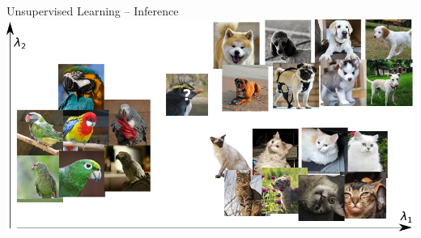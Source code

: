 \documentclass[handout,aspectratio=169]{beamer}
\begin{document}
	\begin{frame}{Unsupervised Learning -- Inference}
		\centering
		\includegraphics[scale=0.95]{media/learning_example_unsupervised_3.pdf}
	\end{frame}
\end{document}
